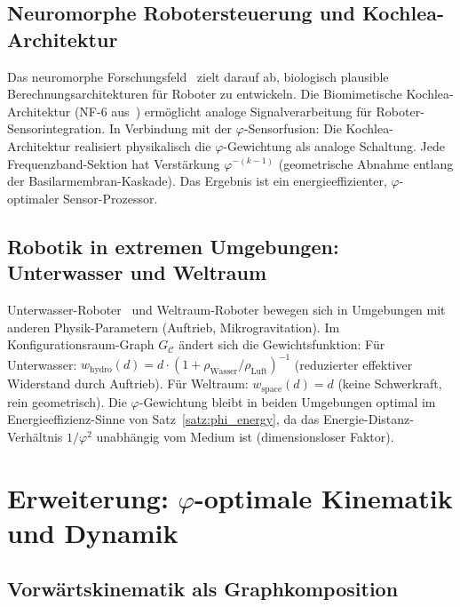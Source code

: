 ﻿\documentclass[a4paper,12pt]{article}
\theoremstyle{definition}
\newcommand{\Cspace}{\mathcal{C}}
\begin{document}
\subsection{Neuromorphe Robotersteuerung und Kochlea-Architektur}

Das neuromorphe Forschungsfeld~\cite{epp2026nf6} zielt darauf ab,
biologisch plausible Berechnungsarchitekturen f\"ur Roboter zu entwickeln.
Die Biomimetische Kochlea-Architektur (NF-6 aus~\cite{epp2026nf6})
erm\"oglicht analoge Signalverarbeitung f\"ur Roboter-Sensorintegration.
In Verbindung mit der $\varphi$-Sensorfusion:
Die Kochlea-Architektur realisiert physikalisch die $\varphi$-Gewichtung
als analoge Schaltung. Jede Frequenzband-Sektion hat Verst\"arkung
$\varphi^{-(k-1)}$ (geometrische Abnahme entlang der Basilarmembran-Kaskade).
Das Ergebnis ist ein energieeffizienter, $\varphi$-optimaler Sensor-Prozessor.

\subsection{Robotik in extremen Umgebungen: Unterwasser und Weltraum}

Unterwasser-Roboter~\cite{epp2026cleanocn} und Weltraum-Roboter bewegen
sich in Umgebungen mit anderen Physik-Parametern (Auftrieb, Mikrogravitation).
Im Konfigurationsraum-Graph $G_{\Cspace}$ \"andert sich die Gewichtsfunktion:
F\"ur Unterwasser: $w_{\text{hydro}}(d) = d \cdot (1 + \rho_{\text{Wasser}}/\rho_{\text{Luft}})^{-1}$
(reduzierter effektiver Widerstand durch Auftrieb).
F\"ur Weltraum: $w_{\text{space}}(d) = d$ (keine Schwerkraft, rein geometrisch).
Die $\varphi$-Gewichtung bleibt in beiden Umgebungen optimal im
Energieeffizienz-Sinne von Satz~\ref{satz:phi_energy}, da das
Energie-Distanz-Verh\"altnis $1/\varphi^2$ unabh\"angig vom
Medium ist (dimensionsloser Faktor).

\section{Erweiterung: $\varphi$-optimale Kinematik und Dynamik}

\subsection{Vorw\"artskinematik als Graphkomposition}
\end{document}
